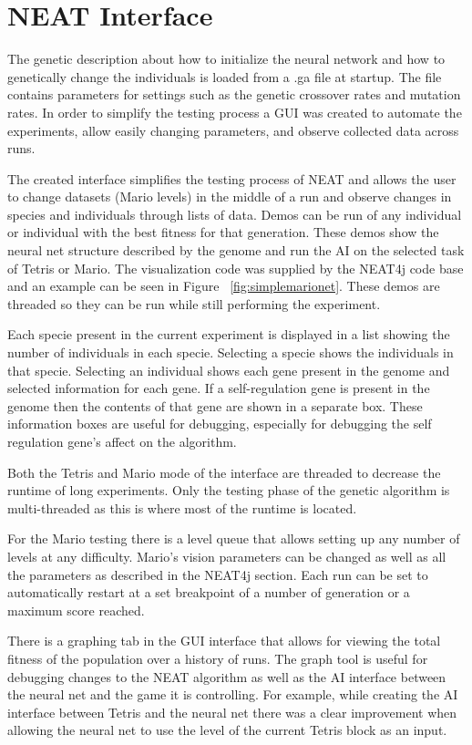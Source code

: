 \documentclass[12pt]{ucthesis} \newif\ifpdf \ifx\pdfoutput\undefined
\begin{document}
\section{NEAT Interface}

The genetic description about how to initialize the neural network and how to
genetically change the individuals is loaded from a .ga file at startup. The
file contains parameters for settings such as the genetic crossover rates and
mutation rates. In order to simplify the testing process a GUI was created to
automate the experiments, allow easily changing parameters, and observe
collected data across runs.

The created interface simplifies the testing process of NEAT and allows the user
to change datasets (Mario levels) in the middle of a run and observe changes in
species and individuals through lists of data. Demos can be run of any individual or
individual with the best fitness for that generation. These demos show the
neural net structure described by the genome and run the AI on the selected task of
Tetris or Mario. The visualization code was supplied by the NEAT4j code base
and an example can be seen in Figure ~\ref{fig:simplemarionet}.
These demos are threaded so they can be run while still performing the
experiment.

Each specie present in the current experiment is displayed in a list showing the
number of individuals in each specie. Selecting a specie shows the
individuals in that specie.
Selecting an individual shows each gene present in the genome and selected
information for each gene. If a self-regulation gene is present in the genome
then the contents of that gene are shown in a separate box. These information
boxes are useful for debugging, especially for debugging the self regulation
gene's affect on the algorithm.

Both the Tetris and Mario mode of the interface are threaded to decrease the
runtime of long experiments. Only the testing phase of the genetic algorithm is
multi-threaded as this is where most of the runtime is located.

For the Mario testing there is a level queue that allows setting up any number
of levels at any difficulty. Mario's vision parameters can be changed as well as
all the parameters as described in the NEAT4j section. Each run can be set to
automatically restart at a set breakpoint of a number of generation or a maximum
score reached.

There is a graphing tab in the GUI interface that allows for viewing the total
fitness of the population over a history of runs. The graph tool is useful for
debugging changes to the NEAT algorithm as well as the AI interface between the
neural net and the game it is controlling. For example, while creating the AI
interface between Tetris and the neural net there was a clear improvement when
allowing the neural net to use the level of the current Tetris block as an
input. 
\end{document}
